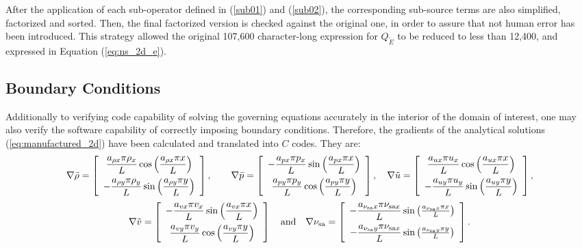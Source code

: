 \documentclass[10pt]{article}
\newcommand{\sa}{\nu_{\mathrm{sa}}}
\newcommand{\tsa}{\mathrm{sa}}
\newcommand{\brho}{\bar{\rho}}
\newcommand{\bp}{\bar{p}}
\newcommand{\tu}{\tilde{u}}
\newcommand{\tv}{\tilde{v}}
\newcommand{\tE}{\tilde{E}}
\begin{document}
 After the application of each sub-operator defined in (\ref{sub01}) and (\ref{sub02}), the corresponding sub-source terms are also simplified, factorized and sorted. Then, the final factorized version is checked against the original one, in order to assure that not human error has been introduced.  This strategy allowed the original  107,600 character-long  expression for $Q_{\tE}$ to be reduced to less than 12,400, and expressed in Equation (\ref{eq:ns_2d_e}).


\subsection{Boundary Conditions}
Additionally to verifying code capability of solving the governing equations accurately in the interior of the domain of interest, one may also verify the software capability of correctly imposing boundary conditions. Therefore, the gradients of the  analytical solutions (\ref{eq:manufactured_2d}) have been calculated and translated into $C$ codes. They are:
\begin{equation*}
\nabla  \brho= \left[ \begin{array}{c}
 \dfrac{  a_{\rho x}  \pi \rho_x}{L} \cos\left( \dfrac{ a_{\rho x}  \pi  x}{L}\right)\vspace{5pt} \\
-\dfrac{  a_{\rho y}  \pi \rho_y}{L} \sin\left( \dfrac{ a_{\rho y}  \pi  y}{L}\right)
\end{array} \right],
\qquad
\nabla \bp = \left[ \begin{array}{c}
- \dfrac{  a_{px}  \pi p_x}{L} \sin\left( \dfrac{ a_{px}  \pi  x}{L}\right)\vspace{5pt}\\
  \dfrac{  a_{py}  \pi p_y}{L} \cos\left( \dfrac{ a_{py}  \pi  y}{L}\right)
\end{array} \right],
\quad
\nabla \tu = \left[ \begin{array}{c}
  \dfrac{  a_{ux}  \pi u_x}{L} \cos\left( \dfrac{ a_{ux}  \pi  x}{L}\right)\vspace{5pt}\\
 -   \dfrac{  a_{uy}  \pi u_y}{L} \sin\left( \dfrac{ a_{uy}  \pi  y}{L}\right)
\end{array} \right],
\end{equation*}
\begin{equation*}
\nabla  \tv= \left[ \begin{array}{c}
-  \dfrac{  a_{vx}  \pi v_x}{L}  \sin\left( \dfrac{ a_{vx}  \pi  x}{L}\right)\vspace{5pt}\\
    \dfrac{  a_{vy}  \pi v_y}{L} \cos\left( \dfrac{ a_{vy}  \pi  y}{L}\right)
\end{array} \right]
\quad\mbox{and}\quad
\nabla \sa = \left[ \begin{array}{c}
-\dfrac{  a_{\sa x}  \pi  \nu_{\tsa x} }{L} \sin\left(\frac{a_{\sa x} \pi x}{L}\right)\vspace{5pt}\\
-  \dfrac{  a_{\sa y}  \pi  \nu_{\tsa x}}{L}  \sin\left(\frac{a_{\sa y} \pi y}{L}\right)
\end{array} \right].
\end{equation*}
\end{document}
